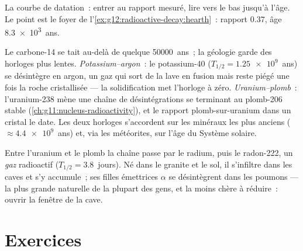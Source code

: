\begin{omfigure}

{\small La courbe de datation~: entrer au rapport mesuré, lire vers le
bas jusqu'à l'âge. Le point est le foyer de
l'\cref{ex:g12:radioactive-decay:hearth}~: rapport $0.37$, âge
\num{8.3e3}~ans.}
\end{omfigure}

\begin{example}\label{ex:g12:radioactive-decay:rocks}
Le carbone-14 se tait au-delà de quelque \num{50000}~ans~; la géologie
garde des horloges plus lentes. \emph{Potassium--argon}~: le
potassium-40 ($T_{1/2} = \num{1.25e9}$~ans) se désintègre en argon, un
gaz qui sort de la lave en fusion mais reste
piégé une fois la roche cristallisée --- la solidification met
l'horloge à zéro. \emph{Uranium--plomb}~: l'uranium-238 mène une chaîne
de désintégrations se terminant au plomb-206
stable (\cref{ch:g11:nucleus-radioactivity}), et le
rapport plomb-sur-uranium dans un cristal le date. Les deux horloges
s'accordent sur les minéraux les plus anciens
($\approx \num{4.4e9}$~ans) et, via les météorites, sur l'âge du
Système solaire.
\end{example}

\begin{remark}\label{rem:g12:radioactive-decay:radon}
Entre l'uranium et le plomb la chaîne passe par le radium, puis le
radon-222, un \emph{gaz} radioactif ($T_{1/2} = 3.8$~jours). Né dans
le granite et le sol, il s'infiltre dans les caves et s'y accumule~;
ses filles émettrices $\alpha$ se désintègrent dans les poumons ---
la plus grande  naturelle de la plupart des
gens, et la moins chère à réduire~: ouvrir la fenêtre de la cave.
\end{remark}

\section{Exercices}


